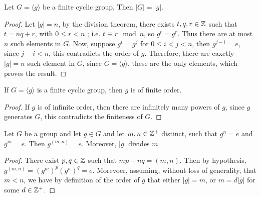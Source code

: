 \begin{proposition}\label{proposition_2.3.3}
  Let $G=\langle g \rangle$ be a finite cyclic group, Then $|G|=|g|$.
\end{proposition}
\begin{proof}
  Let $|g|=n$, by the division theorem, there exists $t,q,r \in \mathbb{Z}$ such
  that  $t=nq+r$, with $0 \leq r < n$ ; i.e. $ t \equiv r \mod{n}$, so
  $g^t=g^r$. Thus there are at most  $n$ such elements in  $G$. Now, suppose
  $g^i=g^j$ for  $0 \leq i < j < n$, then  $g^{j-i}=e$, since $j-i < n$, this
  contradicts the order of  $g$. Therefore, there are eaxctly $|g|=n$ such
  element in $G$, since  $G=\langle g \rangle$, these are the only elements, which
  proves the result.
\end{proof}
\begin{corollary}
  If $G=\langle g \rangle$ is a finite cyclic group, then $g$ is of finite order.
\end{corollary}
\begin{proof}
  If $g$ is of infinite order, then there are infinitely many powers of $g$,
  since $g$ generates  $G$, this contradicts the finiteness of  $G$.
\end{proof}

\begin{proposition}\label{proposition_2.3.4}
  Let $G$ be a group and let  $g \in G$ and let  $m,n \in \mathbb{Z}^+$ distinct, such
  that  $g^n=e$ and  $g^m=e$. Then  $g^{(m,n)}=e$. Moreover, $|g|$
  divides $m$.
\end{proposition}
\begin{proof}
  There exist $p,q \in \mathbb{Z}$ such that $mp+nq=(m,n)$. Then by hypothesis,
  $g^{(m,n)}=(g^m)^p(g^n)^q=e$. Morevoer, assuming, without loss of
  generality, that $m<n$, we have by definition of the order of  $g$ that
  either $|g|=m$, or $m=d|g|$ for some $d \in \mathbb{Z}^+$.
\end{proof}

